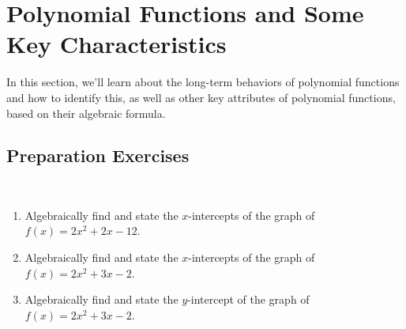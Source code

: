 
\section{Polynomial Functions and Some Key Characteristics} \label{functions-polynomial-long-term}

In this section, we'll learn about the long-term behaviors of polynomial functions and how to identify this, as well as other key attributes of polynomial functions, based on their algebraic formula.     \\[0.5em]


\subsection*{Preparation Exercises} \label{prep-functions-polynomial-long-term}

\begin{myPrep}
~\\ \vspace{-12mm}
	\begin{enumerate}
		\vfill
		\vfill
		\item Algebraically find and state the $x$-intercepts of the graph of $f(x) = 2x^2+2x-12$.
		\vfill
		\item Algebraically find and state  the $x$-intercepts of the graph of $f(x) = 2x^2+3x-2$.
		\vfill
		\item Algebraically find and state  the $y$-intercept of the graph of $f(x) = 2x^2+3x-2$.
		\vfill
	\end{enumerate}
\end{myPrep}



